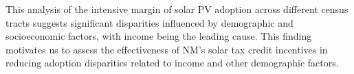 \documentclass[11pt,twoside,letterpaper]{article}
\begin{document}
This analysis of the intensive margin of solar PV adoption across different census tracts suggests significant disparities influenced by demographic and socioeconomic factors, with income being the leading cause. This finding motivates us to assess the effectiveness of NM's solar tax credit incentives in reducing adoption disparities related to income and other demographic factors.





\end{document}
